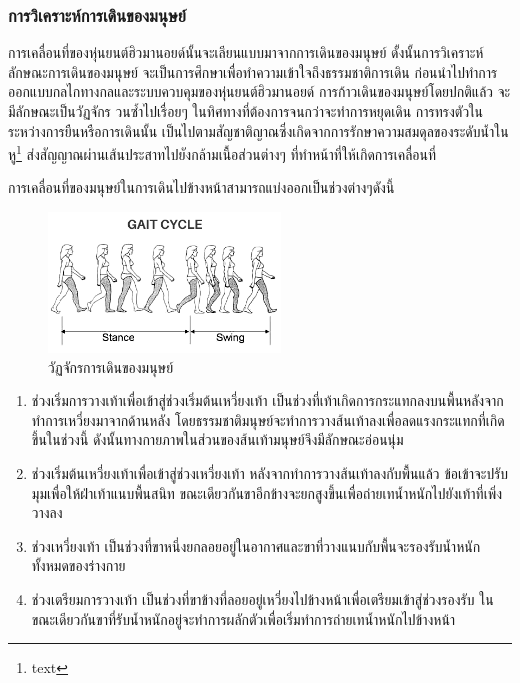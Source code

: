 \subsubsection{การวิเคราะห์การเดินของมนุษย์}
การเคลื่อนที่ของหุ่นยนต์ฮิวมานอยด์นั้นจะเลียนแบบมาจากการเดินของมนุษย์
ดั้งนั้นการวิเคราะห์ลักษณะการเดินของมนุษย์ จะเป็นการศึกษาเพื่อทำความเข้าใจถึงธรรมชาติการเดิน
ก่อนนำไปทำการออกแบบกลไกทางกลและระบบควบคุมของหุ่นยนต์ฮิวมานอยด์
การก้าวเดินของมนุษย์โดยปกติแล้ว จะมีลักษณะเป็นวัฏจักร วนซ้ำไปเรื่อยๆ ในทิศทางที่ต้องการจนกว่าจะทำการหยุดเดิน
การทรงตัวในระหว่างการยืนหรือการเดินนั้น เป็นไปตามสัญชาติญาณซึ่งเกิดจากการรักษาความสมดุลของระดับน้ำในหู\footnote{text}
ส่งสัญญาณผ่านเส้นประสาทไปยังกล้ามเนื้อส่วนต่างๆ ที่ทำหน้าที่ให้เกิดการเคลื่อนที่

การเคลื่อนที่ของมนุษย์ในการเดินไปข้างหน้าสามารถแบ่งออกเป็นช่วงต่างๆดังนี้
\begin{figure}[htbp]
    \centering
    \includegraphics[width=0.55\textwidth]{chapter2/images/gaitcycle.png}
    \caption{วัฏจักรการเดินของมนุษย์}
    \label{fig:human_gait_cycle}
\end{figure}
\begin{enumerate}[label=\arabic*., leftmargin=1.5cm]
    \item ช่วงเริ่มการวางเท้าเพื่อเข้าสู่ช่วงเริ่มต้นเหวี่ยงเท้า เป็นช่วงที่เท้าเกิดการกระแทกลงบนพื้นหลังจากทำการเหวี่ยงมาจากด้านหลัง
    โดยธรรมชาติมนุษย์จะทำการวางส้นเท้าลงเพื่อลดแรงกระแทกที่เกิดขึ้นในช่วงนี้
    ดังนั้นทางกายภาพในส่วนของส้นเท้ามนุษย์จึงมีลักษณะอ่อนนุ่ม
    \item ช่วงเริ่มต้นเหวี่ยงเท้าเพื่อเข้าสู่ช่วงเหวี่ยงเท้า หลังจากทำการวางส้นเท้าลงกับพื้นแล้ว ข้อเข้าจะปรับมุมเพื่อให้ฝ่าเท้าแนบพื้นสนิท
    ขณะเดียวกันขาอีกข้างจะยกสูงขึ้นเพื่อถ่ายเทน้ำหนักไปยังเท้าที่เพิ่งวางลง
	\item ช่วงเหวี่ยงเท้า เป็นช่วงที่ขาหนึ่งยกลอยอยู่ในอากาศและขาที่วางแนบกับพื้นจะรองรับน้ำหนักทั้งหมดของร่างกาย
	\item ช่วงเตรียมการวางเท้า เป็นช่วงที่ขาข้างที่ลอยอยู่เหวี่ยงไปข้างหน้าเพื่อเตรียมเข้าสู่ช่วงรองรับ 
    ในขณะเดียวกันขาที่รับน้ำหนักอยู่จะทำการผลักตัวเพื่อเริ่มทำการถ่ายเทน้ำหนักไปข้างหน้า
\end{enumerate}

